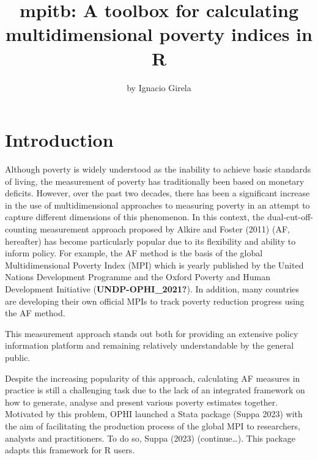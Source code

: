 \title{mpitb: A toolbox for calculating multidimensional poverty indices in R}


\author{by Ignacio Girela}

\maketitle


\hypertarget{introduction}{%
\section{Introduction}\label{introduction}}

Although poverty is widely understood as the inability to achieve basic standards of living, the measurement of poverty has traditionally been based on monetary deficits. However, over the past two decades, there has been a significant increase in the use of multidimensional approaches to measuring poverty in an attempt to capture different dimensions of this phenomenon. In this context, the dual-cut-off-counting measurement approach proposed by Alkire and Foster (2011) (AF, hereafter) has become particularly popular due to its flexibility and ability to inform policy. For example, the AF method is the basis of the global Multidimensional Poverty Index (MPI) which is yearly published by the United Nations Development Programme and the Oxford Poverty and Human Development Initiative (\textbf{UNDP-OPHI\_2021?}). In addition, many countries are developing their own official MPIs to track poverty reduction progress using the AF method.

This measurement approach stands out both for providing an extensive policy information platform and remaining relatively understandable by the general public.

Despite the increasing popularity of this approach, calculating AF measures in practice is still a challenging task due to the lack of an integrated framework on how to generate, analyse and present various poverty estimates together. Motivated by this problem, OPHI launched a Stata package (Suppa 2023) with the aim of facilitating the production process of the global MPI to researchers, analysts and practitioners. To do so, Suppa (2023) (continue\ldots).
This package adapts this framework for R users.

